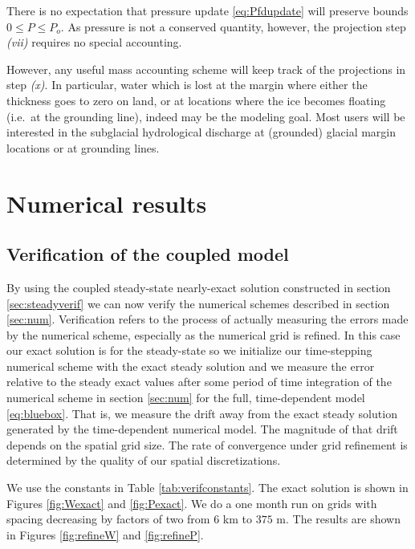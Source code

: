 \documentclass[11pt,final]{amsart}%
\begin{document}
\bigskip\medskip
There is no expectation that pressure update \eqref{eq:Pfdupdate} will preserve bounds $0\le P \le P_o$.  As pressure is not a conserved quantity, however, the projection step \emph{(vii)} requires no special accounting.

However, any useful mass accounting scheme will keep track of the projections in step \emph{(x)}.  In particular, water which is lost at the margin where either the thickness goes to zero on land, or at locations where the ice becomes floating (i.e.~at the grounding line), indeed may be the modeling goal.  Most users will be interested in the subglacial hydrological discharge at (grounded) glacial margin locations or at grounding lines.



\section{Numerical results}  \label{sec:results}

\subsection*{Verification of the coupled model}  By using the coupled steady-state nearly-exact solution constructed in section \ref{sec:steadyverif} we can now verify the numerical schemes described in section \ref{sec:num}.  Verification refers to the process of actually measuring the errors made by the numerical scheme, especially as the numerical grid is refined.  In this case our exact solution is for the steady-state so we initialize our time-stepping numerical scheme with the exact steady solution and we measure the error relative to the steady exact values after some period of time integration of the numerical scheme in section \ref{sec:num} for the full, time-dependent model \eqref{eq:bluebox}.  That is, we measure the drift away from the exact steady solution generated by the time-dependent numerical model.  The magnitude of that drift depends on the spatial grid size.  The rate of convergence under grid refinement is determined by the quality of our spatial discretizations.

We use the constants in Table \ref{tab:verifconstants}.  The exact solution is shown in Figures \ref{fig:Wexact} and \ref{fig:Pexact}.  We do a one month run on grids with spacing decreasing by factors of two from $6$ km to $375$ m.  The results are shown in Figures \ref{fig:refineW} and \ref{fig:refineP}.
\end{document}
